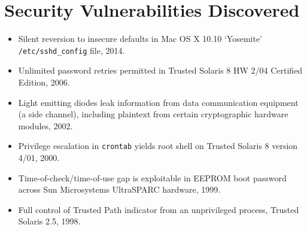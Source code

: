 \vspace{2mm}
\section*{Security Vulnerabilities Discovered}

\vspace{-2mm}
\begin{itemize}
    \item Silent reversion to insecure defaults in Mac OS X 10.10 `Yosemite'
        \texttt{/etc/sshd\_config} file, 2014.\vspace{-2mm}
	\item Unlimited password retries permitted in Trusted Solaris 8 HW 2/04
		Certified Edition, 2006.\vspace{-2mm}
	\item Light emitting diodes leak information from data
        communication equipment (a side channel), including plaintext from
		certain cryptographic hardware modules, 2002.\vspace{-2mm}
	\item Privilege escalation in \verb,crontab, yields root shell on Trusted
		Solaris 8 version 4/01, 2000.\vspace{-2mm}
    \item Time-of-check/time-of-use gap is exploitable in EEPROM boot
        password across Sun Microsystems UltraSPARC hardware, 1999.\vspace{-2mm}
    \item Full control of Trusted Path indicator from an unprivileged process,
        Trusted Solaris 2.5, 1998.\vspace{-2mm}
\end{itemize}

